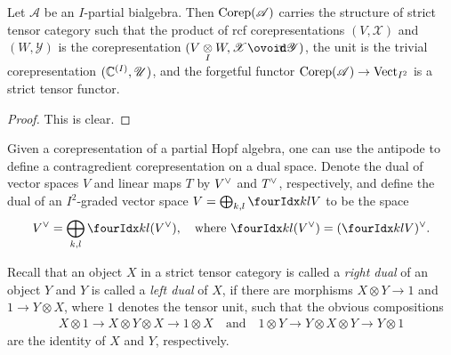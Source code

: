 \begin{Prop} \label{prop:rep-tensor} Let $\mathscr{A}$ be an
  $I$-partial bialgebra. Then  $\mathrm{Corep}(\mathscr{A})$ carries the
  structure of strict tensor category such that the product of rcf corepresentations $(V,\mathscr{X})$ and
  $(W,\mathscr{Y})$ is the corepresentation $(V\itimes
  W,\mathscr{X}\Circt \mathscr{Y})$, the unit is the trivial
  corepresentation $(\mathbb{C}^{(I)},\mathscr{U})$, and the forgetful functor
  $\mathrm{Corep}(\mathscr{A}) \to \mathrm{Vect}_{I^{2}}$ is a strict tensor functor.
\end{Prop}
\begin{proof}
This is clear.
\end{proof}

Given a corepresentation of a partial Hopf algebra, one can use the
antipode to define a contragredient corepresentation on a dual space.
Denote the dual of vector spaces $V$ and  linear maps $T$ by
$V^{\vee}$ and $T^{\vee}$, respectively, and define the dual of an
$I^{2}$-graded vector space $V=\bigoplus_{k,l} \Gru{V}{k}{l}$ to be
the space
\begin{align*}
  \dual{V}=\bigoplus_{k,l} \Gru{(\dual{V})}{k}{l}, \quad \text{where }
\Gru{(\dual{V})}{k}{l} = \dual{(\Gru{V}{k}{l})}.
\end{align*}


Recall that an object $X$ in a strict tensor category is called a
\emph{right dual} of an object $Y$ and $Y$ is called a \emph{left
  dual} of $X$, if there are morphisms $X \otimes Y \to 1$ and $1 \to
Y \otimes X$, where $1$ denotes the tensor unit, such
that the obvious compositions
  \begin{gather*}
 X \otimes 1 \to X\otimes Y\otimes X
  \to 1 \otimes X  \quad\text{and} \quad
     1 \otimes Y \to Y \otimes X \otimes Y \to Y
    \otimes 1 
  \end{gather*}
  are the identity of $X$ and $Y$,
  respectively.  


